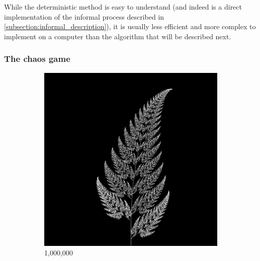\documentclass[11pt]{article}
\begin{document}
While the deterministic method is easy to understand (and indeed is a direct implementation of the informal process described in \autoref{subsection:informal_description}),
it is usually less efficient and more complex to implement on a computer than the algorithm that will be described next.

\subsubsection{The chaos game}
\label{sec:org9211c90}
\label{subsection:chaos_game}

\begin{figure}
     \centering
     \begin{subfigure}[b]{0.4\textwidth}
         \centering
         \includegraphics[width=\textwidth]{figures/barnsley_1000000}
         \caption{1,000,000}
         \label{figure:barnsley_mil}
     \end{subfigure}
     \hfill
     \begin{subfigure}[b]{0.4\textwidth}
         \centering

\end{subfigure}
\end{figure}
\end{document}
